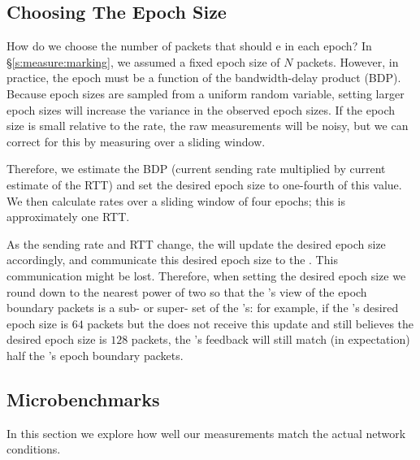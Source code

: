 
\subsection{Choosing The Epoch Size}
\label{s:measure:epoch}
%

How do we choose the number of packets that should e in each epoch?
In \S\ref{s:measure:marking}, we assumed a fixed epoch size of $N$ packets.
However, in practice, the epoch must be a function of the bandwidth-delay product (BDP).
Because epoch sizes are sampled from a uniform random variable, setting larger epoch sizes will increase the variance in the observed epoch sizes.
If the epoch size is small relative to the rate, the raw measurements will be noisy, but we can correct for this by measuring over a sliding window.

Therefore, we estimate the BDP (current sending rate multiplied by current estimate of the RTT) and set the desired epoch size to one-fourth of this value. We then calculate rates over a sliding window of four epochs; this is approximately one RTT.

As the sending rate and RTT change, the \inbox will update the desired epoch size accordingly, and communicate this desired epoch size to the \outbox.
This communication might be lost. 
Therefore, when setting the desired epoch size we round down to the nearest power of two so that the \outbox's view of the epoch boundary packets is a sub- or super- set of the \inbox's:
for example, 
if the \inbox's desired epoch size is $64$ packets
but the \outbox does not receive this update and still believes the desired epoch size is $128$ packets, 
the \outbox's feedback will still match (in expectation) half the \inbox's epoch boundary packets.

\subsection{Microbenchmarks}
\label{s:measure:microbench}
    
    
    
    In this section we explore how well our measurements match the actual network conditions. 

